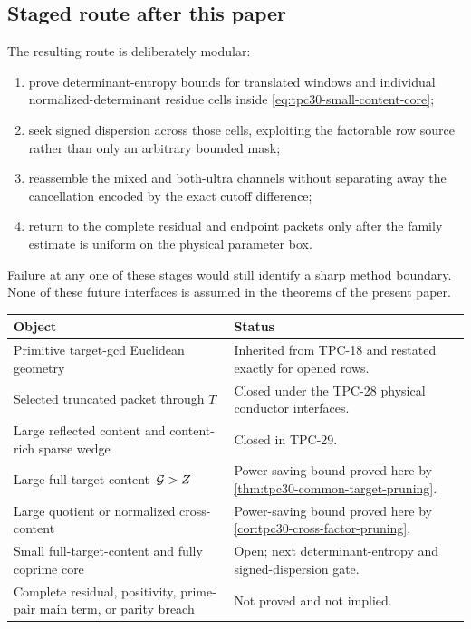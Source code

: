 \subsection{Staged route after this paper}

The resulting route is deliberately modular:
\begin{enumerate}[label={\textup{TPC-\arabic*:}},start=31]
 \item prove determinant-entropy bounds for translated windows and
 individual normalized-determinant residue cells inside
 \eqref{eq:tpc30-small-content-core};
 \item seek signed dispersion across those cells, exploiting the
 factorable row source rather than only an arbitrary bounded mask;
 \item reassemble the mixed and both-ultra channels without separating
 away the cancellation encoded by the exact cutoff difference;
 \item return to the complete residual and endpoint packets only after
 the family estimate is uniform on the physical parameter box.
\end{enumerate}
Failure at any one of these stages would still identify a sharp
method boundary.  None of these future interfaces is assumed in the
theorems of the present paper.

\begin{center}
\begin{tabular}{>{\raggedright\arraybackslash}p{}
                >{\raggedright\arraybackslash}p{}}
\toprule
Object & Status \\
\midrule
Primitive target-gcd Euclidean geometry
& Inherited from TPC-18 and restated exactly for opened rows. \\
\addlinespace
Selected truncated packet through $T$
& Closed under the TPC-28 physical conductor interfaces. \\
\addlinespace
Large reflected content and content-rich sparse wedge
& Closed in TPC-29. \\
\addlinespace
Large full-target content $\,\mathcal G>Z$
& Power-saving bound proved here by
\cref{thm:tpc30-common-target-pruning}. \\
\addlinespace
Large quotient or normalized cross-content
& Power-saving bound proved here by
\cref{cor:tpc30-cross-factor-pruning}. \\
\addlinespace
Small full-target-content and fully coprime core
& Open; next determinant-entropy and signed-dispersion gate. \\
\addlinespace
Complete residual, positivity, prime-pair main term, or parity breach
& Not proved and not implied. \\
\bottomrule
\end{tabular}
\end{center}
